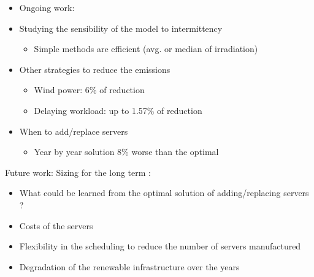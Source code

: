\begin{itemize}

  \item Ongoing work:
    
  \item Studying the sensibility of the model to intermittency
    
    \begin{itemize}
      
    \item Simple methods are efficient (avg. or median of irradiation)

    \end{itemize}

  \item Other strategies to reduce the  emissions

    \begin{itemize}
      
    \item Wind power: 6\% of reduction
    \item Delaying workload: up to 1.57\% of reduction
      
    \end{itemize}
    
  \item When to add/replace servers

    \begin{itemize}
      
    \item Year by year solution 8\% worse than the optimal

      
    \end{itemize}
    
    
  \end{itemize}
Future work:   Sizing for the long term :

  \begin{itemize}
    
  \item What could be learned from the optimal solution of adding/replacing servers ?
  \item Costs of the servers     
  \item Flexibility in the scheduling to reduce the number of
    servers manufactured
  \item Degradation of the renewable infrastructure over the years
    
  \end{itemize}    
